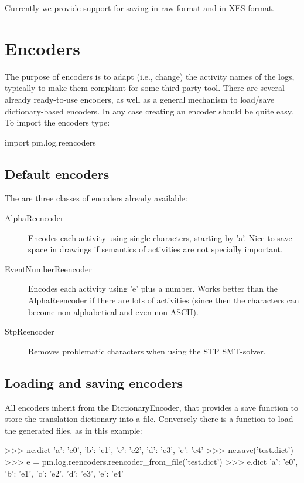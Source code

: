 \documentclass[a4paper,10pt]{book}
\begin{document}
Currently we provide support for saving in raw format and in XES format.

\section{Encoders}
The purpose of encoders is to adapt (i.e., change) the activity names of the logs, typically to make them compliant for some third-party tool. There are several already ready-to-use encoders, as well as a general mechanism to load/save dictionary-based encoders. In any case creating an encoder should be quite easy. To import the encoders type:\\
\begin{pycode}
import pm.log.reencoders
\end{pycode}

\subsection{Default encoders}
The are three classes of encoders already available:
\begin{description}
 \item [AlphaReencoder] Encodes each activity using single characters, starting by 'a'. Nice to save space in drawings if semantics of activities are not specially important.
 \item [EventNumberReencoder] Encodes each activity using 'e' plus a number. Works better than the AlphaReencoder if there are lots of activities (since then the characters can become non-alphabetical and even non-ASCII).
 \item [StpReencoder] Removes problematic characters when using the STP SMT-solver.
\end{description}

\subsection{Loading and saving encoders}
All encoders inherit from the DictionaryEncoder, that provides a save function to store the translation dictionary into a file. Conversely there is a function to load the generated files, as in this example:\\
\begin{pycode}
>>> ne.dict
{'a': 'e0', 'b': 'e1', 'c': 'e2', 'd': 'e3', 'e': 'e4'}
>>> ne.save('test.dict')
>>> e = pm.log.reencoders.reencoder_from_file('test.dict')
>>> e.dict
{'a': 'e0', 'b': 'e1', 'c': 'e2', 'd': 'e3', 'e': 'e4'}
\end{pycode}
\end{document}
